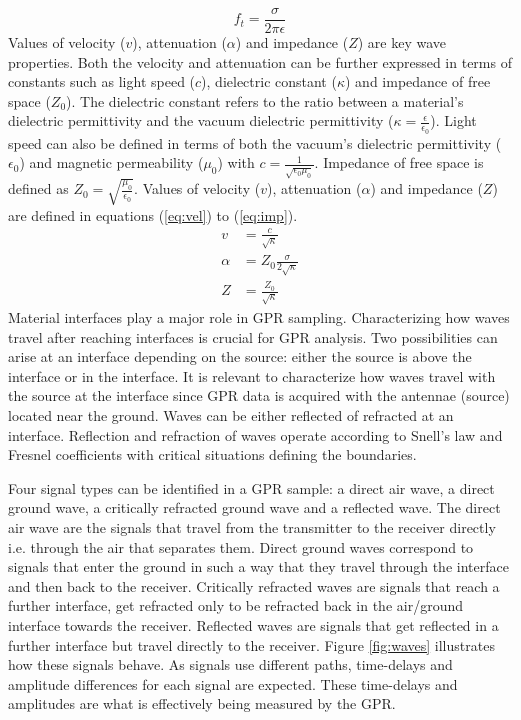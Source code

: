 \documentclass{article}
\begin{document}
\begin{equation}
    f_{t} = \frac{\sigma}{2\pi \epsilon}
    \label{eq:trans_freq}
\end{equation}
Values of velocity ($v$), attenuation ($\alpha$) and impedance ($Z$) are key wave properties. Both the velocity and attenuation can be further expressed in terms of constants such as light speed ($c$), dielectric constant ($\kappa$) and impedance of free space ($Z_{0}$). The dielectric constant refers to the ratio between a material's dielectric permittivity and the vacuum dielectric permittivity ($\kappa = \frac{\epsilon}{\epsilon_{0}}$). Light speed can also be defined in terms of both the vacuum's dielectric permittivity ($\epsilon_{0}$) and magnetic permeability ($\mu_{0}$) with $c=\frac{1}{\sqrt{\epsilon_{0}\mu_{0}}}$. Impedance of free space is defined as $Z_{0} = \sqrt{\frac{\mu_{0}}{\epsilon_{0}}}$. Values of velocity ($v$), attenuation ($\alpha$) and impedance ($Z$) are defined in equations (\ref{eq:vel}) to (\ref{eq:imp}).
\begin{align}
    v &= \frac{c}{\sqrt{\kappa}} \label{eq:vel} \\ 
    \alpha &= Z_{0} \frac{\sigma}{2\sqrt{\kappa}} \label{eq:att} \\
    Z &= \frac{Z_{0}}{\sqrt{\kappa}} \label{eq:imp}
\end{align}
Material interfaces play a major role in GPR sampling. Characterizing how waves travel after reaching interfaces is crucial for GPR analysis. Two possibilities can arise at an interface depending on the source: either the source is above the interface or in the interface. It is relevant to characterize how waves travel with the source at the interface since GPR data is acquired with the antennae (source) located near the ground. Waves can be either reflected of refracted at an interface. Reflection and refraction of waves operate according to Snell's law and Fresnel coefficients with critical situations defining the boundaries.

Four signal types can be identified in a GPR sample: a direct air wave, a direct ground wave, a critically refracted ground wave and a reflected wave. The direct air wave are the signals that travel from the transmitter to the receiver directly i.e. through the air that separates them. Direct ground waves correspond to signals that enter the ground in such a way that they travel through the interface and then back to the receiver. Critically refracted waves are signals that reach a further interface, get refracted only to be refracted back in the air/ground interface towards the receiver. Reflected waves are signals that get reflected in a further interface but travel directly to the receiver. Figure \ref{fig:waves} illustrates how these signals behave. As signals use different paths, time-delays and amplitude differences for each signal are expected. These time-delays and amplitudes are what is effectively being measured by the GPR.
\end{document}
